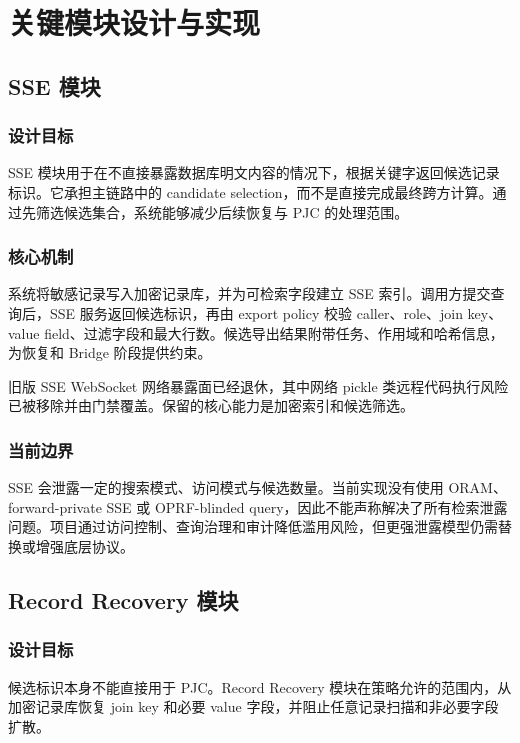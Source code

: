 \documentclass[UTF8,a4paper,12pt,oneside]{ctexrep}
\begin{document}
\chapter{关键模块设计与实现}

\section{SSE 模块}

\subsection{设计目标}

SSE 模块用于在不直接暴露数据库明文内容的情况下，根据关键字返回候选记录标识。它承担主链路中的 candidate selection，而不是直接完成最终跨方计算。通过先筛选候选集合，系统能够减少后续恢复与 PJC 的处理范围。

\subsection{核心机制}

系统将敏感记录写入加密记录库，并为可检索字段建立 SSE 索引。调用方提交查询后，SSE 服务返回候选标识，再由 export policy 校验 caller、role、join key、value field、过滤字段和最大行数。候选导出结果附带任务、作用域和哈希信息，为恢复和 Bridge 阶段提供约束。

旧版 SSE WebSocket 网络暴露面已经退休，其中网络 pickle 类远程代码执行风险已被移除并由门禁覆盖。保留的核心能力是加密索引和候选筛选。

\subsection{当前边界}

SSE 会泄露一定的搜索模式、访问模式与候选数量。当前实现没有使用 ORAM、forward-private SSE 或 OPRF-blinded query，因此不能声称解决了所有检索泄露问题。项目通过访问控制、查询治理和审计降低滥用风险，但更强泄露模型仍需替换或增强底层协议。

\section{Record Recovery 模块}

\subsection{设计目标}

候选标识本身不能直接用于 PJC。Record Recovery 模块在策略允许的范围内，从加密记录库恢复 join key 和必要 value 字段，并阻止任意记录扫描和非必要字段扩散。
\end{document}
